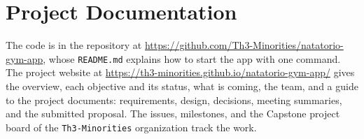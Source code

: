 \section{Project Documentation}

The code is in the repository at \url{https://github.com/Th3-Minorities/natatorio-gym-app}, whose \texttt{README.md} explains how to start the app with one command. The project website at \url{https://th3-minorities.github.io/natatorio-gym-app/} gives the overview, each objective and its status, what is coming, the team, and a guide to the project documents: requirements, design, decisions, meeting summaries, and the submitted proposal. The issues, milestones, and the Capstone project board of the \texttt{Th3-Minorities} organization track the work.
